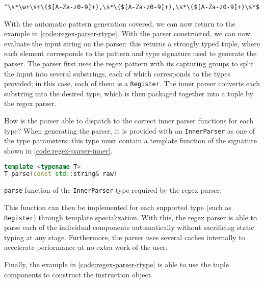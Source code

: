 \texttt{\^{}\textbackslash s*\textbackslash w+\textbackslash s+\textbackslash (\$[A-Za-z0-9]+),\textbackslash s*\textbackslash (\$[A-Za-z0-9]+),\textbackslash s*\textbackslash (\$[A-Za-z0-9]+)\textbackslash s*\$}

With the automatic pattern generation covered, we can now return to the example in \autoref{code:regex-parser-rtype}. With the parser constructed, we can now evaluate the input string on the parser; this returns a strongly typed tuple, where each element corresponds to the pattern and type signature used to generate the parser. The parser first uses the regex pattern with its capturing groups to split the input into several substrings, each of which corresponds to the types provided; in this case, each of them is a \texttt{Register}. The inner parser converts each substring into the desired type, which is then packaged together into a tuple by the regex parser.

How is the parser able to dispatch to the correct inner parser functions for each type? When generating the parser, it is provided with an \texttt{InnerParser} as one of the type parameters; this type must contain a template function of the signature shown in \autoref{code:regex-parser-inner}.

\begin{lstfloat}[H]
    \begin{lstlisting}[language=c++]
template <typename T>
T parse(const std::string& raw)
    \end{lstlisting}
    \caption{\texttt{parse} function of the \texttt{InnerParser} type required by the regex parser.}
    \label{code:regex-parser-inner}
\end{lstfloat}

This function can then be implemented for each supported type (such as \texttt{Register}) through template specialization. With this, the regex parser is able to parse each of the individual components automatically without sacrificing static typing at any stage. Furthermore, the parser uses several caches internally to accelerate performance at no extra work of the user.

Finally, the example in \autoref{code:regex-parser-rtype} is able to use the tuple components to construct the instruction object.